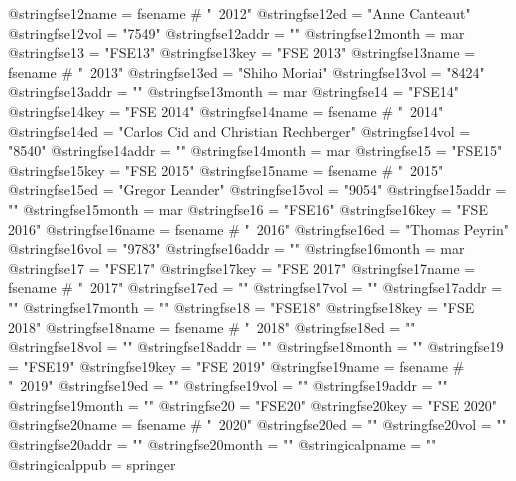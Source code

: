 @string{fse12name =             fsename # "~2012"}
@string{fse12ed =               "Anne Canteaut"}
@string{fse12vol =              "7549"}
@string{fse12addr =             ""}
@string{fse12month =            mar}
@string{fse13 =                 "FSE13"}
@string{fse13key =              "FSE 2013"}
@string{fse13name =             fsename # "~2013"}
@string{fse13ed =               "Shiho Moriai"}
@string{fse13vol =              "8424"}
@string{fse13addr =             ""}
@string{fse13month =            mar}
@string{fse14 =                 "FSE14"}
@string{fse14key =              "FSE 2014"}
@string{fse14name =             fsename # "~2014"}
@string{fse14ed =               "Carlos Cid and Christian Rechberger"}
@string{fse14vol =              "8540"}
@string{fse14addr =             ""}
@string{fse14month =            mar}
@string{fse15 =                 "FSE15"}
@string{fse15key =              "FSE 2015"}
@string{fse15name =             fsename # "~2015"}
@string{fse15ed =               "Gregor Leander"}
@string{fse15vol =              "9054"}
@string{fse15addr =             ""}
@string{fse15month =            mar}
@string{fse16 =                 "FSE16"}
@string{fse16key =              "FSE 2016"}
@string{fse16name =             fsename # "~2016"}
@string{fse16ed =               "Thomas Peyrin"}
@string{fse16vol =              "9783"}
@string{fse16addr =             ""}
@string{fse16month =            mar}
@string{fse17 =                 "FSE17"}
@string{fse17key =              "FSE 2017"}
@string{fse17name =             fsename # "~2017"}
@string{fse17ed =               ""}
@string{fse17vol =              ""}
@string{fse17addr =             ""}
@string{fse17month =            ""}
@string{fse18 =                 "FSE18"}
@string{fse18key =              "FSE 2018"}
@string{fse18name =             fsename # "~2018"}
@string{fse18ed =               ""}
@string{fse18vol =              ""}
@string{fse18addr =             ""}
@string{fse18month =            ""}
@string{fse19 =                 "FSE19"}
@string{fse19key =              "FSE 2019"}
@string{fse19name =             fsename # "~2019"}
@string{fse19ed =               ""}
@string{fse19vol =              ""}
@string{fse19addr =             ""}
@string{fse19month =            ""}
@string{fse20 =                 "FSE20"}
@string{fse20key =              "FSE 2020"}
@string{fse20name =             fsename # "~2020"}
@string{fse20ed =               ""}
@string{fse20vol =              ""}
@string{fse20addr =             ""}
@string{fse20month =            ""}
@string{icalpname =             ""}
@string{icalppub =              springer}
